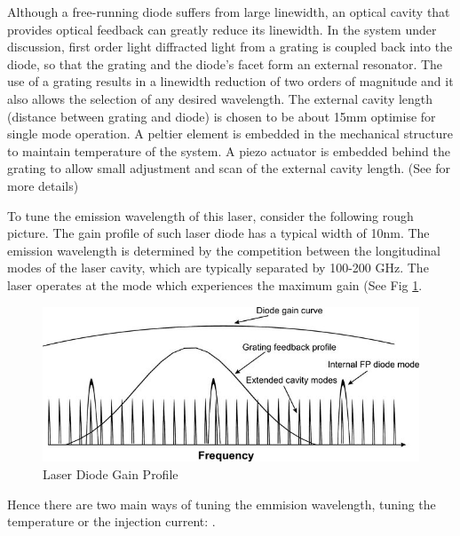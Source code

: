 \documentclass[11pt,A4Paper]{article}
\begin{document}
Although a free-running diode suffers from large linewidth, an optical cavity that provides optical feedback can greatly reduce its linewidth. In the system under discussion, first order light diffracted light from a grating is coupled back into the diode, so that the grating and the diode's facet form an external resonator. The use of a grating results in a linewidth reduction of two orders of magnitude and it also allows the selection of any desired wavelength. The external cavity length (distance between grating and diode) is chosen to be about 15mm optimise for single mode operation. A peltier element is embedded in the mechanical structure to maintain temperature of the system. A piezo actuator is embedded behind the grating to allow small adjustment and scan of the external cavity length. (See \cite{compactGratingDiodeLaser} for more details)
\par
To tune the emission wavelength of this laser, consider the following rough picture. The gain profile of such laser diode has a typical width of 10nm. The emission wavelength is determined by the competition between the longitudinal modes of the laser cavity, which are typically separated by 100-200 GHz. The laser operates at the mode which experiences the maximum gain (See Fig \ref{fig:diodeLaserGainCurve}.
\begin{figure}[H]
    \centering
    \includegraphics[width=.8\textwidth]{diodeLaserGainCurve.jpg}
    \caption{Laser Diode Gain Profile}
    \label{fig:diodeLaserGainCurve}
\end{figure}
Hence there are two main ways of tuning the emmision wavelength, tuning the temperature or the injection current: \cite{compactGratingDiodeLaser}. 
\end{document}
